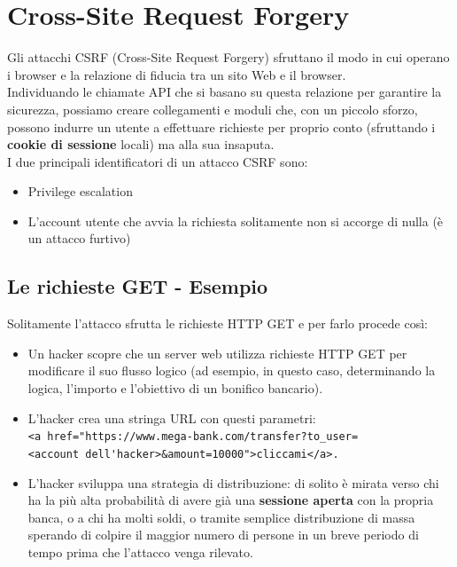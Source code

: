 \chapter{Cross-Site Request Forgery}

Gli attacchi CSRF (Cross-Site Request Forgery) sfruttano il modo in cui operano i browser e la relazione di fiducia tra un sito Web e il browser.\\

Individuando le chiamate API che si basano su questa relazione per garantire la sicurezza, possiamo creare  collegamenti e moduli che, con un piccolo sforzo, possono indurre un utente a effettuare richieste per proprio conto (sfruttando i \textbf{cookie di sessione} locali) ma alla sua insaputa.\\

I due principali identificatori di un attacco CSRF sono:
\begin{itemize}
	\item Privilege escalation 
	\item L'account utente che avvia la richiesta solitamente non si accorge di nulla (è un attacco furtivo)	
\end{itemize}

\section{Le richieste GET - Esempio}
Solitamente l'attacco sfrutta le richieste HTTP GET e per farlo procede così:
\begin{itemize}
	\item Un hacker scopre che un server web utilizza richieste HTTP GET per modificare il suo flusso logico (ad esempio, in questo caso, determinando la logica, l'importo e l'obiettivo di un bonifico bancario).
	\item L'hacker crea una stringa URL con questi parametri:\\ \verb|<a href="https://www.mega-bank.com/transfer?to_user=|\\
	\verb|<account dell'hacker>&amount=10000">cliccami</a>.|
	\item L'hacker sviluppa una strategia di distribuzione: di solito è 
	mirata verso chi ha la più alta probabilità di avere già una \textbf{sessione aperta} con la propria banca, o a chi ha molti soldi, o tramite semplice distribuzione di massa sperando di colpire il maggior numero di persone in un breve periodo di tempo prima che l'attacco venga rilevato.
\end{itemize}

